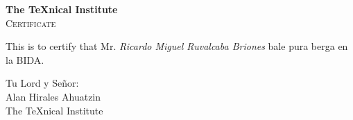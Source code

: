 \documentclass{article}
\begin{document}
\begin{center}
  {\bfseries\huge The \TeX nical Institute}\\[1cm]
    {\scshape\LARGE Certificate}
\end{center}

\noindent This is to certify that Mr. \emph{Ricardo Miguel Ruvalcaba Briones} bale pura berga en la {\large BIDA}.

\begin{flushright}
{\sffamily Tu Lord y Se\~nor:\\
Alan Hirales Ahuatzin}\\[5 pt ]
The \TeX nical Institute
\end{flushright}
\end{document}
